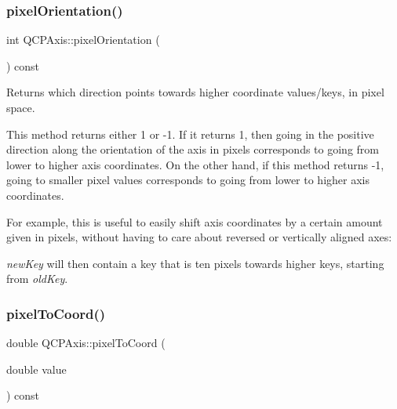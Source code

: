 \mbox{\label{class_q_c_p_axis_a45c45bed7e5666683b8d56afa66fa51f}} 
\subsubsection{\texorpdfstring{pixelOrientation()}{pixelOrientation()}}
{\footnotesize\ttfamily int Q\+C\+P\+Axis\+::pixel\+Orientation (\begin{DoxyParamCaption}{ }\end{DoxyParamCaption}) const\hspace{0.3cm}{\ttfamily [inline]}}

Returns which direction points towards higher coordinate values/keys, in pixel space.

This method returns either 1 or -\/1. If it returns 1, then going in the positive direction along the orientation of the axis in pixels corresponds to going from lower to higher axis coordinates. On the other hand, if this method returns -\/1, going to smaller pixel values corresponds to going from lower to higher axis coordinates.

For example, this is useful to easily shift axis coordinates by a certain amount given in pixels, without having to care about reversed or vertically aligned axes\+:


\begin{DoxyCode}{0}
\end{DoxyCode}


{\itshape new\+Key} will then contain a key that is ten pixels towards higher keys, starting from {\itshape old\+Key}. \mbox{\label{class_q_c_p_axis_a536ef8f624cac59b6b6fdcb495723c57}} 
\subsubsection{\texorpdfstring{pixelToCoord()}{pixelToCoord()}}
{\footnotesize\ttfamily double Q\+C\+P\+Axis\+::pixel\+To\+Coord (\begin{DoxyParamCaption}\item[{double}]{value }\end{DoxyParamCaption}) const}

